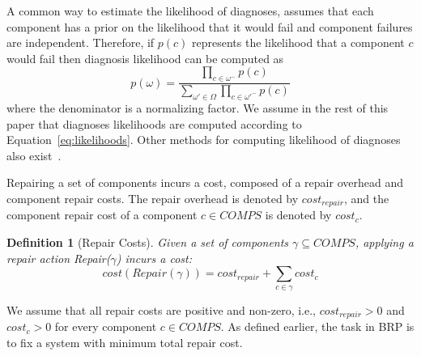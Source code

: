 \documentclass[letterpaper]{article}
\newcommand\meir[1]{\textcolor{red}{meir: #1}}
\newtheorem{definition}{Definition}
\newcommand{\cost}{\textit{cost}}
\newcommand{\COMPS}{\textit{COMPS}}
\begin{document}
A common way to estimate the likelihood of diagnoses, assumes that each component has a prior on the likelihood that it would fail and component failures are independent. Therefore, if $p(c)$ represents the likelihood that a component $c$ would fail then diagnosis likelihood can be computed as
\begin{equation}
\displaystyle p(\omega)=\frac{\prod_{c\in\omega^{-}} p(c)}{\sum_{\omega'\in\Omega}{\prod_{c\in\omega'^{-}} p(c)}}
\label{eq:likelihoods}
\end{equation}
where the denominator is a normalizing factor. %
We assume in the rest of this paper that diagnoses likelihoods are computed according to Equation~\ref{eq:likelihoods}. Other methods for computing likelihood of diagnoses also exist~\cite{mengshoel2010probabilistic}.

Repairing a set of components incurs a cost, composed of a repair overhead and component repair costs. The repair overhead is denoted by $\cost_{repair}$, and the component repair cost of a component $c\in \COMPS$ is denoted by $\cost_{c}$.



\begin{definition}[Repair Costs]
Given a set of components $\gamma\subseteq \COMPS$, applying a repair action Repair($\gamma$) incurs a cost:
\[ \cost(Repair(\gamma)) = \cost_{repair} + \sum_{c\in \gamma} \cost_{c} \]
\end{definition}
We assume that all repair costs are positive and non-zero, i.e., $\cost_{repair}>0$ and $\cost_{c}>0$ for every component $c \in \COMPS$. As defined earlier, the task in BRP is to fix a system with minimum total repair cost.
\end{document}
